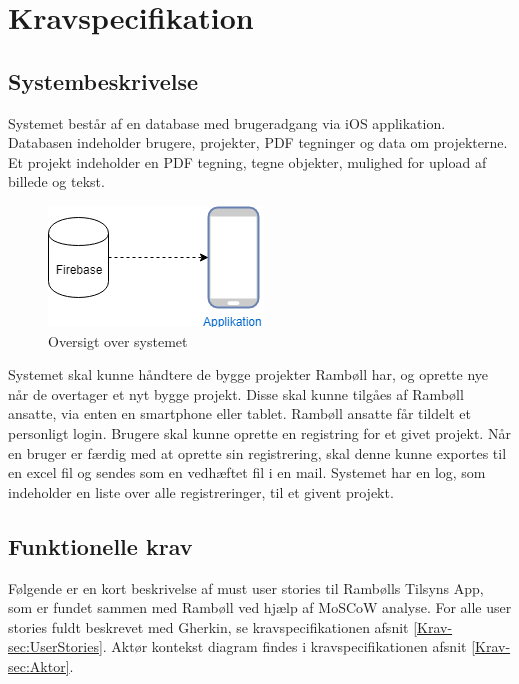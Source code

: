 	\chapter{Kravspecifikation}
	
		\section{Systembeskrivelse}
		Systemet består af en database med brugeradgang via iOS applikation.
		Databasen indeholder brugere, projekter, PDF tegninger og data om projekterne.
		Et projekt indeholder en PDF tegning, tegne objekter, mulighed for upload af billede og tekst.
		
		\begin{figure}[H]
			\centering
			\includegraphics[width=0.4\linewidth]{Kravspecifikation/Oversigtoversystem}
			\caption{Oversigt over systemet}
			\label{fig:OversigtSystembeskrivelse}
		\end{figure}
		
		Systemet skal kunne håndtere de bygge projekter Rambøll har, og oprette nye når de overtager et nyt bygge projekt.
		Disse skal kunne tilgåes af Rambøll ansatte, via enten en smartphone eller tablet.
		Rambøll ansatte får tildelt et personligt login.
		Brugere skal kunne oprette en registring for et givet projekt.
		Når en bruger er færdig med at oprette sin registrering, skal denne kunne exportes til en excel fil og sendes som en vedhæftet fil i en mail.
		Systemet har en log, som indeholder en liste over alle registreringer, til et givent projekt. \\	
				
		\clearpage

	
	\section{Funktionelle krav} 
	Følgende er en kort beskrivelse af must user stories til Rambølls Tilsyns App, som er fundet sammen med Rambøll ved hjælp af MoSCoW analyse. \cite{MoSCoW} For alle user stories fuldt beskrevet med Gherkin, se kravspecifikationen afsnit \ref{Krav-sec:UserStories}.
	Aktør kontekst diagram findes i kravspecifikationen afsnit \ref{Krav-sec:Aktor}.

